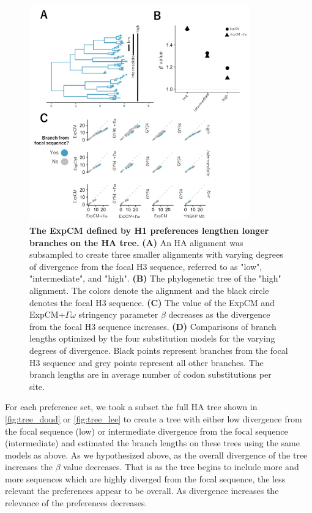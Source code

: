 \documentclass[11pt]{article}
\begin{document}
\begin{figure}[H]
\centerline{\includegraphics[width=0.85\textwidth]{figures/doud_compete}}
\caption{\label{fig:doud_compete}
\textbf{The ExpCM defined by H1 preferences lengthen longer branches on the HA tree.} 
\textbf{(A)} An HA alignment was subsampled to create three smaller alignments with varying degrees of divergence from the focal H3 sequence, referred to as "low", "intermediate", and "high". 
\textbf{(B)} The phylogenetic tree of the "high" alignment. 
The colors denote the alignment and the black circle denotes the focal H3 sequence. 
\textbf{(C)} The value of the ExpCM and ExpCM+$\Gamma\omega$ stringency parameter $\beta$ decreases as the divergence from the focal H3 sequence increases. 
\textbf{(D)} Comparisons of branch lengths optimized by the four substitution models for the varying degrees of divergence. 
Black points represent branches from the focal H3 sequence and grey points represent all other branches.  
The branch lengths are in average number of codon substitutions per site. 
}
\end{figure}

For each preference set, we took a subset the full HA tree shown in \ref{fig:tree_doud} or \ref{fig:tree_lee} to create a tree with either low divergence from the focal sequence (low) or intermediate divergence from the focal sequence (intermediate) and estimated the branch lengths on these trees using the same models as above. 
As we hypothesized above, as the overall divergence of the tree increases the $\beta$ value decreases. 
That is as the tree begins to include more and more sequences which are highly diverged from the focal sequence, the less relevant the preferences appear to be overall. 
As divergence increases the relevance of the preferences decreases. 
\end{document}
